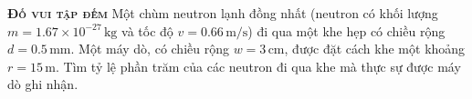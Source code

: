 
\begin{problem}
	{\textbf{\textsc{Đố vui tập đếm}}} Một chùm neutron lạnh đồng nhất (neutron có khối lượng \( m = 1.67 \times 10^{-27} \, \text{kg} \) và tốc độ \( v = 0.66 \, \text{m/s} \)) đi qua một khe hẹp có chiều rộng \( d = 0.5 \, \text{mm} \). Một máy dò, có chiều rộng \( w = 3 \, \text{cm} \), được đặt cách khe một khoảng \( r = 15 \, \text{m} \). Tìm tỷ lệ phần trăm của các neutron đi qua khe mà thực sự được máy dò ghi nhận.
\end{problem}
